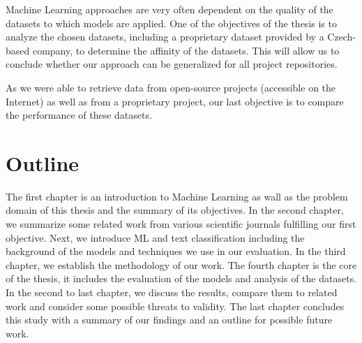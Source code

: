 Machine Learning approaches are very often dependent on the quality of the datasets to which models are applied. One of the objectives of the thesis is to analyze the chosen datasets, including a proprietary dataset provided by a Czech-based company, to determine the affinity of the datasets. This will allow us to conclude whether our approach can be generalized for all project repositories.

As we were able to retrieve data from open-source projects (accessible on the Internet) as well as from a proprietary project, our last objective is to compare the performance of these datasets. 

\section{Outline}

The first chapter is an introduction to Machine Learning as wall as the problem domain of this thesis and the summary of its objectives. In the second chapter, we summarize some related work from various scientific journals fulfilling our first objective. Next, we introduce ML and text classification including the background of the models and techniques we use in our evaluation. In the third chapter, we establish the methodology of our work. The fourth chapter is the core of the thesis, it includes the evaluation of the models and analysis of the datasets. In the second to last chapter, we discuss the results, compare them to related work and consider some possible threats to validity. The last chapter concludes this study with a summary of our findings and an outline for possible future work.